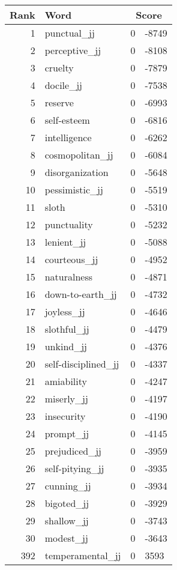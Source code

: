 \begin{longtable}[!htbp]{| rlr@{.}l |}
    \hline
    \textbf{Rank} & \textbf{Word} & \multicolumn{2}{c|}{\textbf{Score}} \\
    \hline
    \endhead
    1 & punctual\_jj & 0 & -8749 \\
    2 & perceptive\_jj & 0 & -8108 \\
    3 & cruelty & 0 & -7879 \\
    4 & docile\_jj & 0 & -7538 \\
    5 & reserve & 0 & -6993 \\
    6 & self-esteem & 0 & -6816 \\
    7 & intelligence & 0 & -6262 \\
    8 & cosmopolitan\_jj & 0 & -6084 \\
    9 & disorganization & 0 & -5648 \\
    10 & pessimistic\_jj & 0 & -5519 \\
    11 & sloth & 0 & -5310 \\
    12 & punctuality & 0 & -5232 \\
    13 & lenient\_jj & 0 & -5088 \\
    14 & courteous\_jj & 0 & -4952 \\
    15 & naturalness & 0 & -4871 \\
    16 & down-to-earth\_jj & 0 & -4732 \\
    17 & joyless\_jj & 0 & -4646 \\
    18 & slothful\_jj & 0 & -4479 \\
    19 & unkind\_jj & 0 & -4376 \\
    20 & self-disciplined\_jj & 0 & -4337 \\
    21 & amiability & 0 & -4247 \\
    22 & miserly\_jj & 0 & -4197 \\
    23 & insecurity & 0 & -4190 \\
    24 & prompt\_jj & 0 & -4145 \\
    25 & prejudiced\_jj & 0 & -3959 \\
    26 & self-pitying\_jj & 0 & -3935 \\
    27 & cunning\_jj & 0 & -3934 \\
    28 & bigoted\_jj & 0 & -3929 \\
    29 & shallow\_jj & 0 & -3743 \\
    30 & modest\_jj & 0 & -3643 \\
    392 & temperamental\_jj & 0 & 3593 \\

\end{longtable}

